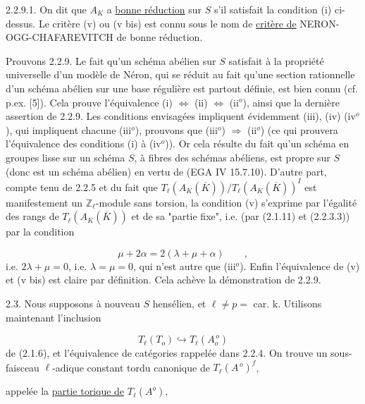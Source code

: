 2.2.9.1. On dit que $A_K$ a \underline{bonne réduction} sur $S$ s'il satisfait la condition (i) ci-dessus. Le critère (v) ou (v bis) est connu sous le nom de \underline{critère de} NERON-OGG-CHAFAREVITCH de bonne réduction.



Prouvons 2.2.9. Le fait qu'un schéma abélien sur $S$ satisfait à la propriété universelle d'un modèle de Néron, qui se réduit au fait qu'une section rationnelle d'un schéma abélien sur une base régulière est partout définie, est bien connu (cf. p.ex. [5]). Cela prouve l'équivalence (i) $\Longleftrightarrow$ (ii) $\Longleftrightarrow$ (ii$^o$), ainsi que la dernière assertion de 2.2.9. Les conditions envisagées impliquent évidemment (iii), (iv) (iv$^o$), qui impliquent chacune (iii$^o$), prouvons que (iii$^o$) $\Longrightarrow$ (ii$^o$) (ce qui prouvera l'équivalence des conditions (i) à (iv$^o$)). Or cela résulte du fait qu'un schéma en groupes lisse sur un schéma $S$, à fibres des schémas abéliens, est propre sur $S$ (donc est un schéma abélien) en vertu de (EGA IV 15.7.10). D'autre part, compte tenu de 2.2.5 et du fait que $T_\ell(A_K(\overline{K}))/T_\ell(A_K(\overline{K}))^I$ est manifestement un $\mathbb{Z}_\ell$-module sans torsion, la condition (v) s'exprime par l'égalité des rangs de $T_\ell(A_K(\overline{K}))$ et de sa "partie fixe", i.e. (par (2.1.11) et (2.2.3.3)) par la condition

\begin{equation*}
\mu + 2\alpha = 2(\lambda + \mu + \alpha) \qquad ,
\end{equation*}
i.e. $2\lambda + \mu = 0$, i.e. $\lambda = \mu = 0$, qui n'est autre que (iii$^o$). Enfin l'équivalence de (v) et (v bis) est claire par définition. Cela achève la démonstration de 2.2.9.

2.3. Nous supposons à nouveau $S$ hensélien, et $\ell \neq p =$ car. k. Utilisons maintenant l'inclusion

\begin{equation}\tag{2.3.1}
T_\ell(T_o) \hookrightarrow T_\ell(A_o^{\,o})
\end{equation}
de (2.1.6), et l'équivalence de catégories rappelée dans 2.2.4. On trouve un sous-faisceau $\ell$-adique constant tordu canonique de $T_\ell(A^{\,o})^f$,



appelée la \underline{partie torique de} $T_\ell(A^o)$,

